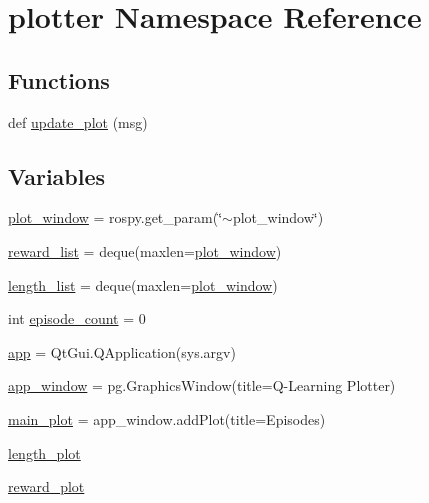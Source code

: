 \hypertarget{namespaceplotter}{}\section{plotter Namespace Reference}
\label{namespaceplotter}
\subsection*{Functions}
\begin{DoxyCompactItemize}
\item 
def \hyperlink{namespaceplotter_a4dd8967dd22ff14b03fcc921ec7dcc3d}{update\+\_\+plot} (msg)
\end{DoxyCompactItemize}
\subsection*{Variables}
\begin{DoxyCompactItemize}
\item 
\hyperlink{namespaceplotter_abbb49ab9c0174321374123fd800937f1}{plot\+\_\+window} = rospy.\+get\+\_\+param(\char`\"{}$\sim$plot\+\_\+window\char`\"{})
\item 
\hyperlink{namespaceplotter_aa648ebbb57476267f9430be51eeb420c}{reward\+\_\+list} = deque(maxlen=\hyperlink{namespaceplotter_abbb49ab9c0174321374123fd800937f1}{plot\+\_\+window})
\item 
\hyperlink{namespaceplotter_ab7eba5fc23c3791ab6bca7c5c975d2b8}{length\+\_\+list} = deque(maxlen=\hyperlink{namespaceplotter_abbb49ab9c0174321374123fd800937f1}{plot\+\_\+window})
\item 
int \hyperlink{namespaceplotter_aec1d6d729c0b25355f045e1f5bdc588f}{episode\+\_\+count} = 0
\item 
\hyperlink{namespaceplotter_ab20bf5077ebe79698f5f02f62dcb33d2}{app} = Qt\+Gui.\+Q\+Application(sys.\+argv)
\item 
\hyperlink{namespaceplotter_aac09effafbbcb0f637092be85f99c351}{app\+\_\+window} = pg.\+Graphics\+Window(title=\textquotesingle{}Q-\/Learning Plotter\textquotesingle{})
\item 
\hyperlink{namespaceplotter_a40d656a97d2e7039f17ee5742490ecf9}{main\+\_\+plot} = app\+\_\+window.\+add\+Plot(title=\textquotesingle{}Episodes\textquotesingle{})
\item 
\hyperlink{namespaceplotter_ac0842708a1e94becc6bb776a68a9ac5f}{length\+\_\+plot}
\item 
\hyperlink{namespaceplotter_a40062593c153ab9d59f836890f82dfc7}{reward\+\_\+plot}
\end{DoxyCompactItemize}


